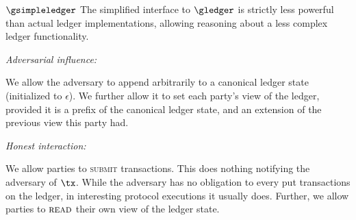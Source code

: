 \begin{functionalitysketch}{$\gsimpleledger$}
    The simplified interface to $\gledger$ is strictly less powerful than
    actual ledger implementations, allowing reasoning about a less complex
    ledger functionality.

    \vspace{1em}
    \noindent\emph{Adversarial influence:}

    We allow the adversary to append arbitrarily to a canonical ledger state
    (initialized to $\epsilon$). We further allow it to set each party's view of
    the ledger, provided it is a prefix of the canonical ledger state, and an
    extension of the previous view this party had.

    \vspace{1em}
    \noindent\emph{Honest interaction:}

    We allow parties to \textsc{submit} transactions. This does nothing
    notifying the adversary of $\tx$. While the adversary has no obligation to
    every put transactions on the ledger, in interesting protocol executions it
    usually does. Further, we allow parties to $\textsc{read}$ their own view
    of the ledger state.
\end{functionalitysketch}


